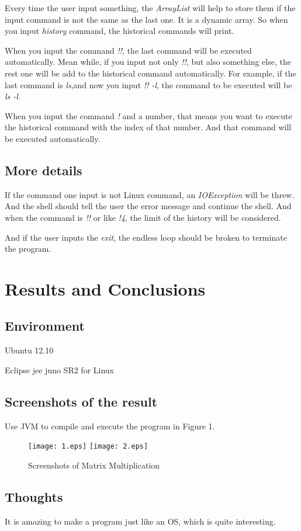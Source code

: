 \documentclass{article}
\begin{document}
Every time the user input something, the \emph{ArrayList} will help to store them if the input command is not the same as the last one. It is a dynamic array. So when you input \emph{history} command, the historical commands will print.

When you input the command \emph{!!}, the last command will be executed automatically. Mean while, if you input not only \emph{!!}, but also something else, the rest one will be add to the historical command automatically. For example, if the last command is \emph{ls},and now you input \emph{!! -l}, the command to be executed will be \emph{ls -l}.

When you input the command \emph{!} and a number, that means you want to execute the historical command with the index of that number. And that command will be executed automatically.

\subsection{More details}
If the command one input is not Linux command, an \emph{IOException} will be threw. And the shell should tell the user the error message and continue the shell. And when the command is \emph{!!} or like \emph{!4}, the limit of the history will be considered.

And if the user inputs the \emph{exit}, the endless loop should be broken to terminate the program.


\section{Results and Conclusions}
\subsection{Environment}
\begin{compactitem}
\item Ubuntu 12.10
\item Eclipse jee juno SR2 for Linux
\end{compactitem}
\subsection{Screenshots of the result}
Use JVM to compile and execute the program in Figure 1.
\begin{figure}[h]
\centering
\texttt{[image: 1.eps]}
\texttt{[image: 2.eps]}
\caption{Screenshots of Matrix Multiplication}
\end{figure}

\subsection{Thoughts}
It is amazing to make a program just like an OS, which is quite interesting.

\end{document}
